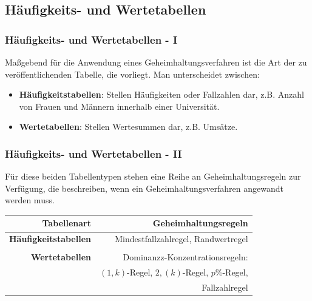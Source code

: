\documentclass[aspectratio=169]{beamer}
\begin{document}
\subsection{Häufigkeits- und Wertetabellen}

\begin{frame}
    \frametitle{Häufigkeits- und Wertetabellen - I}
    Maßgebend für die Anwendung eines Geheimhaltungsverfahren ist die Art der zu veröffentlichenden Tabelle, die vorliegt. Man unterscheidet zwischen:
    \begin{itemize}
        \item \textbf{Häufigkeitstabellen}: Stellen Häufigkeiten oder Fallzahlen dar, z.B. Anzahl von Frauen und Männern innerhalb einer Universität.
        \item \textbf{Wertetabellen}: Stellen Wertesummen dar, z.B. Umsätze.
    \end{itemize}
\end{frame}


\begin{frame}
    \frametitle{Häufigkeits- und Wertetabellen - II}
    Für diese beiden Tabellentypen stehen eine Reihe an Geheimhaltungsregeln zur Verfügung, die beschreiben, wenn ein Geheimhaltungsverfahren angewandt werden muss.
    \begin{center}
        \begin{tabular}{ r r }
         \textbf{Tabellenart} \vline & \textbf{Geheimhaltungsregeln} \\ 
         \hline
         \textbf{Häufigkeitstabellen} \vline & Mindestfallzahlregel, Randwertregel \\  
         \vline & \\
         \hline
         \textbf{Wertetabellen} \vline & Dominanzz-Konzentrationsregeln:  \\
         \vline & $(1,k)$-Regel, $2,(k)$-Regel, $p$\%-Regel, \\
         \vline & Fallzahlregel
        \end{tabular}
    \end{center}
\end{frame}
\end{document}
